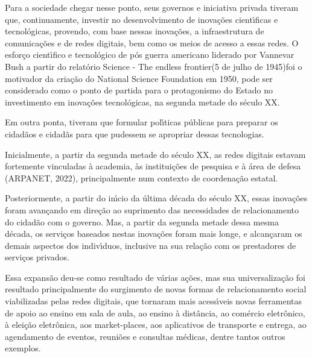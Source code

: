 \documentclass[
12pt,		%
openright,	%
twoside,  %
a4paper,			%
chapter=TITLE,		%
english,			%
french,				%
spanish,			%
brazil				%
]{USPSC-classe/USPSC}
\begin{document}
Para a sociedade chegar nesse ponto, seus governos e iniciativa privada tiveram que, continuamente, investir no desenvolvimento de inova\c{c}\~oes cient\'{\i}ficas e tecnol\'ogicas,  provendo, com base nessas inova\c{c}\~oes, a infraestrutura de comunica\c{c}\~oes e de redes digitais, bem como os meios de acesso a essas redes. O esfor\c{c}o cient\'{\i}fico e tecnol\'ogico de p\'os guerra americano liderado por Vannevar Bush a partir do relat\'orio \textquotedbl Science - The endless frontier\textquotedbl (5 de julho de 1945)foi o motivador da cria\c{c}\~ao do National Science Foundation em 1950, pode ser considerado como o ponto de partida para o protagonismo do Estado no investimento em inova\c{c}\~oes tecnol\'ogicas, na segunda metade do s\'eculo XX.










Em outra ponta, tiveram que formular pol\'{\i}ticas p\'ublicas para preparar os cidad\~aos e cidad\~as para que pudessem se apropriar dessas tecnologias.










Inicialmente, a partir da segunda metade do s\'eculo XX, as redes digitais estavam fortemente vinculadas \`a academia, \`as institui\c{c}\~oes de pesquisa e \`a \'area de defesa  (ARPANET, 2022), principalmente num contexto de coordena\c{c}\~ao estatal.










Posteriormente, a partir do in\'{\i}cio da \'ultima d\'ecada do s\'eculo XX, essas inova\c{c}\~oes  foram avan\c{c}ando em dire\c{c}\~ao ao suprimento das necessidades de relacionamento do cidad\~ao com o governo. Mas, a partir da segunda metade dessa mesma d\'ecada, os servi\c{c}os baseados nestas inova\c{c}\~oes foram mais longe, e alcan\c{c}aram  os demais aspectos dos indiv\'{\i}duos, inclusive na sua rela\c{c}\~ao com os prestadores de servi\c{c}os privados.










Essa expans\~ao deu-se como resultado de v\'arias a\c{c}\~oes, mas sua universaliza\c{c}\~ao foi resultado principalmente do surgimento de novas formas de relacionamento social viabilizadas pelas redes digitais, que tornaram mais acess\'{\i}veis novas ferramentas de apoio ao ensino em sala de aula, ao ensino \`a dist\^ancia, ao com\'ercio eletr\^onico, \`a elei\c{c}\~ao eletr\^onica, aos \textquotedbl market-places\textquotedbl , aos aplicativos de transporte e entrega, ao agendamento de eventos, reuni\~oes e consultas m\'edicas, dentre tantos outros exemplos.
\end{document}
